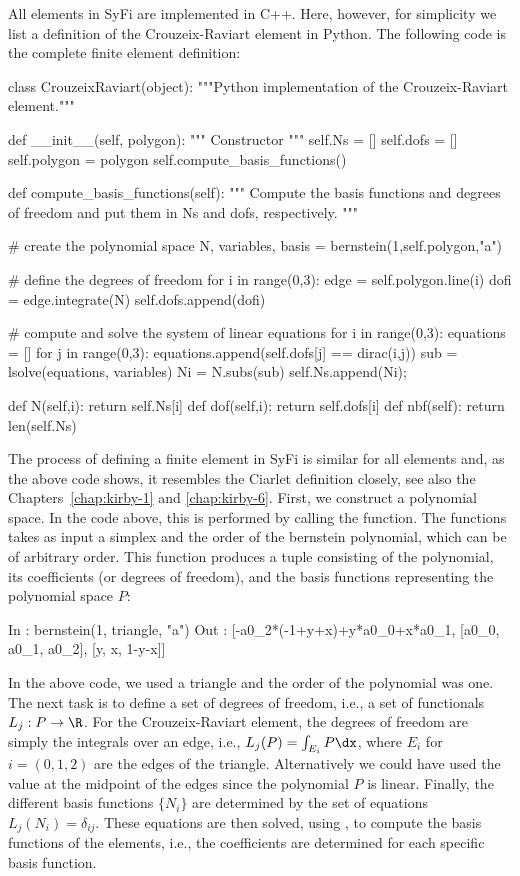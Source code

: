 All elements in SyFi are implemented in C++. Here, however, for simplicity we list a definition 
of the Crouzeix-Raviart element in Python.  The following code is the complete
finite element definition: 
\begin{python}
class CrouzeixRaviart(object): 
  """Python implementation of the Crouzeix-Raviart element.""" 

  def __init__(self, polygon):  
    """ Constructor """
    self.Ns = []
    self.dofs = []
    self.polygon = polygon 
    self.compute_basis_functions()

  def compute_basis_functions(self): 
    """ Compute the basis functions and degrees of freedom  
    and put them in Ns and dofs, respectively.  """

    # create the polynomial space
    N, variables, basis = bernstein(1,self.polygon,"a")

    # define the degrees of freedom 
    for i in range(0,3): 
      edge = self.polygon.line(i)
      dofi = edge.integrate(N) 
      self.dofs.append(dofi)

    # compute and solve the system of linear equations
    for i in range(0,3): 
      equations = []
      for j in range(0,3): 
        equations.append(self.dofs[j] == dirac(i,j))
      sub = lsolve(equations, variables) 
      Ni = N.subs(sub) 
      self.Ns.append(Ni); 

  def N(self,i): return self.Ns[i]
  def dof(self,i): return self.dofs[i]
  def nbf(self): return len(self.Ns)
\end{python}
The process of defining a finite element in SyFi is similar for all elements and,
as the above code shows,  it resembles the Ciarlet definition closely, see
also the Chapters~\ref{chap:kirby-1} and \ref{chap:kirby-6}. 
First, we construct a polynomial space. In the code above, this is performed by calling the 
function. The  functions takes as input a simplex and the order of the bernstein polynomial, 
which can be of arbitrary order. This function produces a tuple consisting of 
the polynomial, its coefficients (or degrees of freedom), and the basis functions
representing the polynomial space $P$: 
\begin{python}
In  : bernstein(1, triangle, "a")
Out : [-a0_2*(-1+y+x)+y*a0_0+x*a0_1, [a0_0, a0_1, a0_2], [y, x, 1-y-x]]
\end{python}
In the above code, we used a triangle and the order of the polynomial was one. The next task is to 
define a set of degrees of freedom, i.e., a set of functionals $L_j : P \rightarrow \R$. 
For the Crouzeix-Raviart element, the degrees of freedom are simply the integrals 
over an edge, i.e., $L_j(P) = \int_{E_i} P \dx$, where $E_i$ for $i=(0,1,2)$ are the edges of 
the triangle. Alternatively we could have used
the value at the midpoint of the edges since the polynomial $P$ is linear. 
Finally, the different basis functions $\{N_i\}$ are determined by the  
set of equations $L_j(N_i) = \delta_{ij}$. 
These equations are then solved, using , to compute the basis functions of the elements, i.e., the
coefficients \emp{[a0\_0, a0\_1, a0\_2]}  are determined for each specific basis function.

